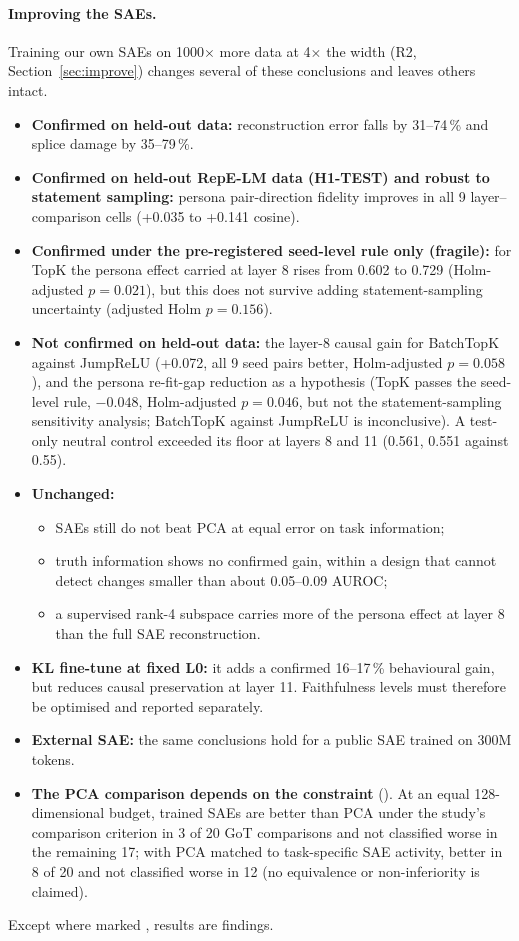 \paragraph{Improving the SAEs.} Training our own SAEs on 1000$\times$ more data at 4$\times$ the width (R2,
Section~\ref{sec:improve}) changes several of these conclusions and leaves others intact.
\begin{itemize}
\item \textbf{Confirmed on held-out data:} reconstruction error falls by 31--74\,\% and splice damage by
  35--79\,\%.
\item \textbf{Confirmed on held-out RepE-LM data (H1-TEST) and robust to statement sampling:} persona
  pair-direction fidelity improves in all 9 layer--comparison cells (+0.035 to +0.141 cosine).
\item \textbf{Confirmed under the pre-registered seed-level rule only (fragile):} for TopK the persona effect carried
  at layer 8 rises from 0.602 to 0.729 (Holm-adjusted $p=0.021$), but this does not survive adding
  statement-sampling uncertainty (adjusted Holm $p=0.156$).
\item \textbf{Not confirmed on held-out data:} the layer-8 causal gain for BatchTopK against JumpReLU (+0.072, all 9
  seed pairs better, Holm-adjusted $p=0.058$), and the persona re-fit-gap reduction as a hypothesis (TopK passes the seed-level rule,
  $-0.048$, Holm-adjusted $p=0.046$, but not the statement-sampling sensitivity analysis; BatchTopK against JumpReLU
  is inconclusive). A test-only neutral control
  exceeded its floor at layers 8 and 11 (0.561, 0.551 against 0.55).
\item \textbf{Unchanged:}
  \begin{itemize}
  \item SAEs still do not beat PCA at equal error on task information;
  \item truth information shows no confirmed gain, within a design that cannot detect changes smaller than about
    0.05--0.09 AUROC;
  \item a supervised rank-4 subspace carries more of the persona effect at layer 8 than the full SAE reconstruction.
  \end{itemize}
\item \textbf{KL fine-tune at fixed L0:} it adds a confirmed 16--17\,\% behavioural gain, but reduces causal
  preservation at layer 11. Faithfulness levels must therefore be optimised and reported separately.
\item \textbf{External SAE:} the same conclusions hold for a public SAE trained on 300M tokens.
\item \textbf{The PCA comparison depends on the constraint} (). At an equal 128-dimensional
  budget, trained SAEs are better than PCA under the study's comparison criterion in 3 of 20 GoT comparisons and not
  classified worse in the remaining 17; with PCA matched to task-specific SAE activity, better in 8 of 20 and not
  classified worse in 12 (no equivalence or non-inferiority is claimed).
\end{itemize}
Except where marked , results are  findings.

